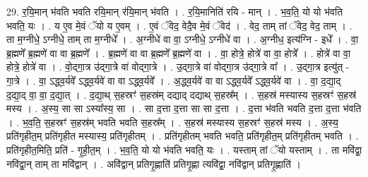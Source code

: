 \documentclass[17pt]{extarticle}
\begin{document}
29. र॒यि॒मान् भ॑वति भवति रयि॒मान् र॑यि॒मान् भ॑वति । . र॒यि॒मानिति॑ रयि - मान् । . भ॒व॒ति॒ यो यो भ॑वति भवति॒ यः । . य ए॒व मे॒वं ॅयो य ए॒वम् । . ए॒वं ॅवेद॒ वेदै॒व मे॒वं ॅवेद॑ । . वेद॒ ताम् तां ॅवेद॒ वेद॒ ताम् । . ता म॒ग्नीधे॒ ऽग्नीधे॒ ताम् ता म॒ग्नीधे᳚ । . अ॒ग्नीधे॑ वा वा॒ ऽग्नीधे॒ ऽग्नीधे॑ वा । . अ॒ग्नीध॒ इत्य॑ग्नि - इधे᳚ । . वा॒ ब्र॒ह्मणे᳚ ब्र॒ह्मणे॑ वा वा ब्र॒ह्मणे᳚ । . ब्र॒ह्मणे॑ वा वा ब्र॒ह्मणे᳚ ब्र॒ह्मणे॑ वा । . वा॒ होत्रे॒ होत्रे॑ वा वा॒ होत्रे᳚ । . होत्रे॑ वा वा॒ होत्रे॒ होत्रे॑ वा । . वो॒द्‍गा॒त्र उ॑द्‍गा॒त्रे वा॑ वोद्‍गा॒त्रे । . उ॒द्‍गा॒त्रे वा॑ वोद्‍गा॒त्र उ॑द्‍गा॒त्रे वा᳚ । . उ॒द्‍गा॒त्र इत्यु॑त् - गा॒त्रे । . वा॒ ऽद्ध्व॒र्यवे᳚ ऽद्ध्व॒र्यवे॑ वा वा ऽद्ध्व॒र्यवे᳚ । . अ॒द्ध्व॒र्यवे॑ वा वा ऽद्ध्व॒र्यवे᳚ ऽद्ध्व॒र्यवे॑ वा । . वा॒ द॒द्या॒द् द॒द्या॒द् वा॒ वा॒ द॒द्या॒त् । . द॒द्या॒थ् स॒हस्रꣳ॑ स॒हस्र॑म् दद्याद् दद्याथ् स॒हस्र᳚म् । . स॒हस्र॑ मस्यास्य स॒हस्रꣳ॑ स॒हस्र॑ मस्य । . अ॒स्य॒ सा सा ऽस्या᳚स्य॒ सा । . सा द॒त्ता द॒त्ता सा सा द॒त्ता । . द॒त्ता भ॑वति भवति द॒त्ता द॒त्ता भ॑वति । . भ॒व॒ति॒ स॒हस्रꣳ॑ स॒हस्र॑म् भवति भवति स॒हस्र᳚म् । . स॒हस्र॑ मस्यास्य स॒हस्रꣳ॑ स॒हस्र॑ मस्य । . अ॒स्य॒ प्रति॑गृहीत॒म् प्रति॑गृहीत मस्यास्य॒ प्रति॑गृहीतम् । . प्रति॑गृहीतम् भवति भवति॒ प्रति॑गृहीत॒म् प्रति॑गृहीतम् भवति । . प्रति॑गृहीत॒मिति॒ प्रति॑ - गृ॒ही॒त॒म् । . भ॒व॒ति॒ यो यो भ॑वति भवति॒ यः । . यस्ताम् तां ॅयो यस्ताम् । . ता मवि॑द्वा॒ नवि॑द्वा॒न् ताम् ता मवि॑द्वान् । . अवि॑द्वान् प्रतिगृ॒ह्णाति॑ प्रतिगृ॒ह्णा त्यवि॑द्वा॒ नवि॑द्वान् प्रतिगृ॒ह्णाति॑ । \newline
\end{document}
